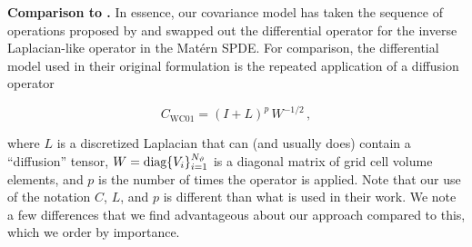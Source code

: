 \noindent\textbf{Comparison to \citet{weaver_correlation_2001}.}
In essence, our covariance model has taken the sequence of operations proposed
by \citet{weaver_correlation_2001} and swapped out the differential operator for
the inverse Laplacian-like operator in the Mat\'ern SPDE.
For comparison, the differential model used in their original formulation is
the repeated application of a diffusion operator
\begin{linenomath*}\begin{equation*}
    C_{\text{WC01}} = (I + L)^p \, W^{-1/2} \, ,
\end{equation*}\end{linenomath*}
where $L$ is a discretized Laplacian that can (and usually does) contain a
``diffusion'' tensor, $W = \text{diag}\{V_i\}_{i=1}^{N_{\vartheta}}$ is a diagonal
matrix of grid cell volume
elements, and $p$ is the number of times the operator is applied.
Note that our use of the notation $C$, $L$, and $p$ is different than what
is used in their work.
We note a few differences that we find advantageous about our approach
compared to this, which we order by importance.
